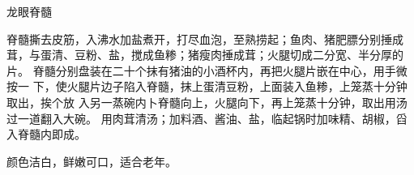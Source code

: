 \begin{recipe}{龙眼脊髓}

\ingredients


\preparation

\step 脊髓撕去皮筋，入沸水加盐煮开，打尽血泡，至熟捞起；鱼肉、猪肥膘分别捶成
茸，与蛋清、豆粉、盐，搅成鱼糁；猪瘦肉捶成茸；火腿切成二分宽、半分厚的片。
\step 脊髓分别盘装在二十个抹有猪油的小酒杯内，再把火腿片嵌在中心，用手微按一
下，使火腿片边子陷入脊髓，抹上蛋清豆粉，上面装入鱼糁，上笼蒸十分钟取出，挨个放
入另一蒸碗内卜脊髓向上，火腿向下，再上笼蒸十分钟，取出用汤过一道翻入大碗。
\step 用肉茸清汤；加料酒、酱油、盐，临起锅时加味精、胡椒，舀入脊髓内即成。

\features

颜色洁白，鲜嫩可口，适合老年。

\end{recipe}

